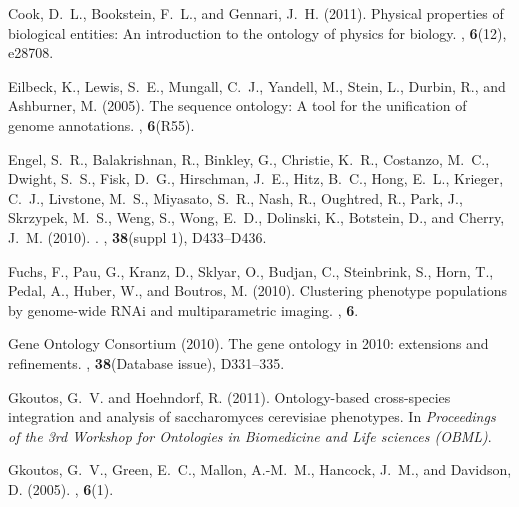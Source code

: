 \documentclass{bioinfo}
\begin{document}
\begin{thebibliography}{}
Cook, D.~L., Bookstein, F.~L., and Gennari, J.~H. (2011).
\newblock Physical properties of biological entities: An introduction to the
  ontology of physics for biology.
, {\bf 6}(12), e28708.

Eilbeck, K., Lewis, S.~E., Mungall, C.~J., Yandell, M., Stein, L., Durbin, R.,
  and Ashburner, M. (2005).
\newblock The sequence ontology: A tool for the unification of genome
  annotations.
, {\bf 6}(R55).

Engel, S.~R., Balakrishnan, R., Binkley, G., Christie, K.~R., Costanzo, M.~C.,
  Dwight, S.~S., Fisk, D.~G., Hirschman, J.~E., Hitz, B.~C., Hong, E.~L.,
  Krieger, C.~J., Livstone, M.~S., Miyasato, S.~R., Nash, R., Oughtred, R.,
  Park, J., Skrzypek, M.~S., Weng, S., Wong, E.~D., Dolinski, K., Botstein, D.,
  and Cherry, J.~M. (2010).
.
, {\bf 38}(suppl 1), D433--D436.

Fuchs, F., Pau, G., Kranz, D., Sklyar, O., Budjan, C., Steinbrink, S., Horn,
  T., Pedal, A., Huber, W., and Boutros, M. (2010).
\newblock Clustering phenotype populations by genome-wide {RNAi} and
  multiparametric imaging.
, {\bf 6}.

{Gene Ontology Consortium} (2010).
\newblock The gene ontology in 2010: extensions and refinements.
, {\bf 38}(Database issue), D331--335.

Gkoutos, G.~V. and Hoehndorf, R. (2011).
\newblock Ontology-based cross-species integration and analysis of
  saccharomyces cerevisiae phenotypes.
\newblock In {\em Proceedings of the 3rd Workshop for Ontologies in Biomedicine
  and Life sciences (OBML)\/}.

Gkoutos, G.~V., Green, E.~C., Mallon, A.-M.~M., Hancock, J.~M., and Davidson,
  D. (2005).
, {\bf 6}(1).


\end{thebibliography}
\end{document}
